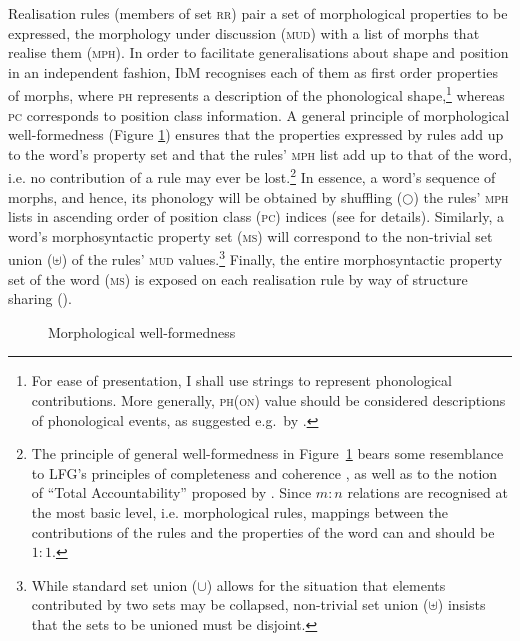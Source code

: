 \documentclass[output=paper]{langsci/langscibook}
\begin{document}
Realisation rules (members of set \textsc{rr}) pair a set of
morphological properties to be expressed, the morphology under
discussion (\textsc{mud}) with a list of morphs that realise them
(\textsc{mph}). In order to facilitate generalisations about shape and
position in an independent fashion, IbM recognises each of them as
first order properties of morphs, where \textsc{ph} represents
a description of the phonological shape,\footnote{For ease of
  presentation, I shall use strings to represent phonological
  contributions. More generally, \textsc{ph(on)} value should be
  considered descriptions of phonological events, as suggested e.g.\ by
\citet{Bird:Klein:94}.} whereas \textsc{pc} corresponds
to position class information.  A general principle of morphological
well-formedness (Figure \ref{fig:MCC}) ensures that the properties
expressed by rules add up to the word's property set and that the
rules' \textsc{mph} list add up to that of the word, i.e. no
contribution of a rule may ever be lost.\footnote{The principle of
  general well-formedness in Figure~\ref{fig:MCC} bears some
  resemblance to LFG's principles of completeness and coherence
  \citep{bresnan_j82}, as well as to the notion of ``Total
  Accountability'' proposed by \citet{Hockett47}. Since $m:n$ relations
  are recognised at the most basic level, i.e. morphological rules,
  mappings between the contributions of the rules and the properties
  of the word can and should be $1:1$. } In essence, a word's sequence
of morphs, and hence, its phonology will be obtained by shuffling
($\bigcirc$) the rules' \textsc{mph} lists in ascending order of
position class (\textsc{pc}) indices (see \citealt{bonami-crysmann:2013} for details). 
Similarly, a word's morphosyntactic
property set (\textsc{ms}) will correspond to the non-trivial set
union ($\uplus$) of the rules' \textsc{mud} values.\footnote{While
  standard set union ($\cup$) allows for the situation that elements
  contributed by two sets may be collapsed, non-trivial set union
  ($\uplus$) insists that the sets to be unioned must be disjoint.}
Finally, the entire morphosyntactic property set of the word (\textsc{ms}) is
exposed on each realisation rule by way of structure sharing
(\negmedspace\avm{\0}).

\begin{figure}
  \caption{Morphological well-formedness\label{fig:MCC}}
\end{figure}
\end{document}
